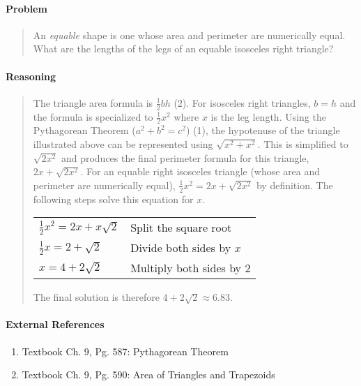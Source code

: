 \documentclass[letterpaper,12pt,twoside]{report}
\begin{document}
	\pagestyle{fancy}
	\fancyhf{}
	
	\paragraph{Problem}
	\begin{quote}
	\textsf{An \textit{equable} shape is one whose area and perimeter are numerically equal. What are the lengths of the legs of an equable isosceles right triangle?}
	\end{quote}
	
	\begin{center}
	\end{center}
	
	\paragraph{Reasoning}
	\begin{quotation}
	
	The triangle area formula is $\frac{1}{2}bh$ (2). For isosceles right triangles, $b=h$ and the formula is specialized to $\frac{1}{2}x^2$ where $x$ is the leg length. Using the Pythagorean Theorem ($a^2+b^2=c^2$) (1), the hypotenuse of the triangle illustrated above can be represented using $\sqrt{x^2+x^2}$. This is simplified to $\sqrt{2x^2}$ and produces the final perimeter formula for this triangle, $2x+\sqrt{2x^2}$. For an equable right isosceles triangle (whose area and perimeter are numerically equal), $\frac{1}{2}x^2 = 2x+\sqrt{2x^2}$ by definition. The following steps solve this equation for $x$.
	
	\begin{center}
		\begin{tabular}{l | l}
			$\frac{1}{2}x^2 = 2x+x\sqrt{2}$ & Split the square root \\
			$\frac{1}{2}x = 2+\sqrt{2}$ & Divide both sides by $x$ \\
			$x = 4+2\sqrt{2}$ & Multiply both sides by 2
		\end{tabular}
	\end{center}

	The final solution is therefore $\boxed{4+2\sqrt{2} \approx 6.83}$.
	
	\end{quotation}
	
	\paragraph{External References}
	
	\begin{enumerate}
		\item Textbook Ch. 9, Pg. 587: Pythagorean Theorem
		\item Textbook Ch. 9, Pg. 590: Area of Triangles and Trapezoids
	\end{enumerate}
\end{document}
